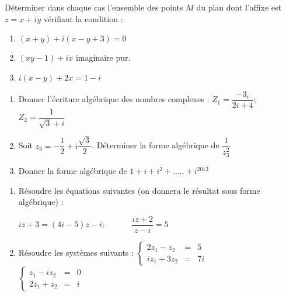 \documentclass[a4paper,12pt]{article}
\renewcommand{\monlien}[2]{}
\renewcommand{\macible}[1]{}
\begin{document}
\monlien{points}{\maboite{Retour Cours}}



\vspace{.5cm}

\EXO %

\macible{exoegalite}{}

D\'eterminer dans chaque cas l'ensemble des points $M$ du plan dont l'affixe est $z=x+iy$ v\'erifiant la condition :
\begin{enumerate}
\item $(x+y)+i(x-y+3)=0$
\item $(xy-1)+ix$ imaginaire pur.
\item $i(x-y)+2x=1-i$
\end{enumerate}


\EXO

\begin{enumerate}
 \item Donner l'\'ecriture alg\'ebrique des nombres complexes  :
$Z_1=\dfrac{-3_i}{2i+4}$;\ \  \ \ \ \  $Z_2=\dfrac{1}{\sqrt{3}+i}$

\item Soit $z_3=-\dfrac{1}{2}+i\dfrac{\sqrt{3}}{2}$. D\'eterminer la forme alg\'ebrique de $\dfrac{1}{z_3^2}$

\item Donner la forme alg\'ebrique de $1+i+i^2+.....+i^{2013}$

\end{enumerate}

\EXO

\begin{enumerate}
\item R\'esoudre les \'equations suivantes (on donnera le r\'esultat sous forme alg\'ebrique) :

$iz+3=(4i-5)z-i$; \ \ \ \ \ \ $\dfrac{iz+2}{z-i}=5$

\item R\'esoudre les syst\`emes suivants : $\left\lbrace\begin{array}{rcl} 
							  2z_1 - z_2 & =&5 \\
                                                         iz_1 +3z_2 &=&7i
\end{array}\right.$ \ \ \ \ \ \ \ 
$\left\lbrace\begin{array}{rcl} 
							  z_1 - iz_2 & =&0\\
                                                         2z_1 +z_2 &=&i
\end{array}\right.$

\end{enumerate}
\end{document}

